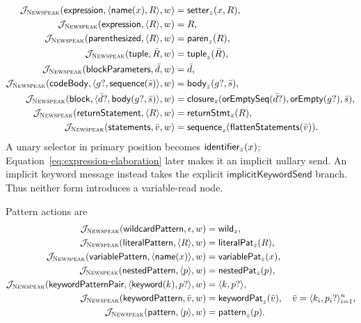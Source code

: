 \begin{equation}\label{eq:newspeak-compound-expression-actions}
\begin{aligned}
 \mathcal J_{\textsc{Newspeak}}(\mathsf{expression},
      \langle\mathsf{name}(x),R\rangle,w)&=\mathsf{setter}_{z}(x,R),\\
 \mathcal J_{\textsc{Newspeak}}(\mathsf{expression},\langle R\rangle,w)&=R,\\
 \mathcal J_{\textsc{Newspeak}}(\mathsf{parenthesized},\langle R\rangle,w)&=\mathsf{paren}_{z}(R),\\
 \mathcal J_{\textsc{Newspeak}}(\mathsf{tuple},\bar R,w)&=\mathsf{tuple}_{z}(\bar R),\\
 \mathcal J_{\textsc{Newspeak}}(\mathsf{blockParameters},\bar d,w)&=\bar d,\\
 \mathcal J_{\textsc{Newspeak}}(\mathsf{codeBody},
      \langle g?,\mathsf{sequence}(\bar s)\rangle,w)
   &=\mathsf{body}_{z}(g?,\bar s),\\
 \mathcal J_{\textsc{Newspeak}}(\mathsf{block},
      \langle\bar d?,\mathsf{body}(g?,\bar s)\rangle,w)
   &=\mathsf{closure}_{z}(\mathsf{orEmptySeq}(\bar d?),
       \mathsf{orEmpty}(g?),\bar s),\\
 \mathcal J_{\textsc{Newspeak}}(\mathsf{returnStatement},\langle R\rangle,w)
   &=\mathsf{returnStmt}_{z}(R),\\
 \mathcal J_{\textsc{Newspeak}}(\mathsf{statements},\bar v,w)&=
      \mathsf{sequence}_{z}(\mathsf{flattenStatements}(\bar v)).
\end{aligned}
\end{equation}
A unary selector in primary position becomes $\mathsf{identifier}_{z}(x)$;
Equation~\eqref{eq:expression-elaboration} later makes it an implicit nullary
send.  An implicit keyword message instead takes the explicit
$\mathsf{implicitKeywordSend}$ branch.  Thus neither form introduces a
variable-read node.

Pattern actions are
\begin{equation}\label{eq:newspeak-pattern-actions}
\begin{aligned}
 \mathcal J_{\textsc{Newspeak}}(\mathsf{wildcardPattern},\epsilon,w)&=\mathsf{wild}_{z},\\
 \mathcal J_{\textsc{Newspeak}}(\mathsf{literalPattern},\langle R\rangle,w)&=
      \mathsf{literalPat}_{z}(R),\\
 \mathcal J_{\textsc{Newspeak}}(\mathsf{variablePattern},\langle\mathsf{name}(x)\rangle,w)&=
      \mathsf{variablePat}_{z}(x),\\
 \mathcal J_{\textsc{Newspeak}}(\mathsf{nestedPattern},\langle p\rangle,w)&=
      \mathsf{nestedPat}_{z}(p),\\
 \mathcal J_{\textsc{Newspeak}}(\mathsf{keywordPatternPair},
      \langle\mathsf{keyword}(k),p?\rangle,w)&=\langle k,p?\rangle,\\
 \mathcal J_{\textsc{Newspeak}}(\mathsf{keywordPattern},\bar v,w)&=
      \mathsf{keywordPat}_{z}(\bar v),
      \quad\bar v=\langle k_i,p_i?\rangle_{i=1}^{n},\\
 \mathcal J_{\textsc{Newspeak}}(\mathsf{pattern},\langle p\rangle,w)&=\mathsf{pattern}_{z}(p).
\end{aligned}
\end{equation}

